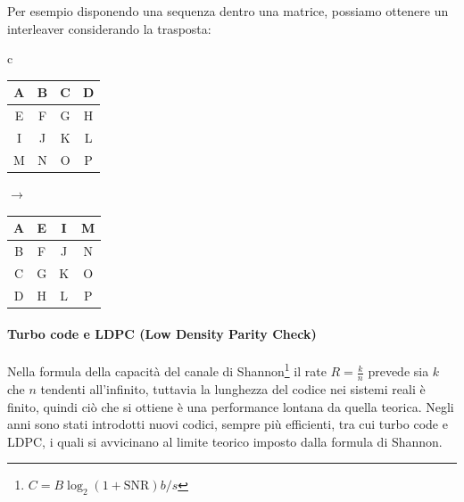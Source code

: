 Per esempio disponendo una sequenza dentro una matrice, possiamo ottenere un interleaver considerando la trasposta:
\begin{table}[h!]
    \centering
    \begin{tabular}{c}
    
    \begin{tabular}{|c|c|c|c|}
    \hline
    A & B & C & D \\ \hline
    E & F & G & H \\ \hline
    I & J & K & L \\ \hline
    M & N & O & P \\ \hline
    \end{tabular}
    
    \quad $\rightarrow$ \quad
    
    \begin{tabular}{|c|c|c|c|}
    \hline
    A & E & I & M \\ \hline
    B & F & J & N \\ \hline
    C & G & K & O \\ \hline
    D & H & L & P \\ \hline
    \end{tabular}
    
    \end{tabular}
\end{table}
   

\begin{center}
\end{center}



\paragraph*{Turbo code e LDPC (Low Density Parity Check)}
Nella formula della capacità del canale di Shannon\footnote{$C=B\log_2(1+\text{SNR}) \si{b/s}$} il rate $R = \frac{k}{n}$ prevede sia $k$ che $n$ tendenti all'infinito, tuttavia la lunghezza del codice nei sistemi reali è finito, quindi ciò che si ottiene è una performance lontana da quella teorica.
Negli anni sono stati introdotti nuovi codici, sempre più efficienti, tra cui turbo code e LDPC, i quali si avvicinano al limite teorico imposto dalla formula di Shannon.


